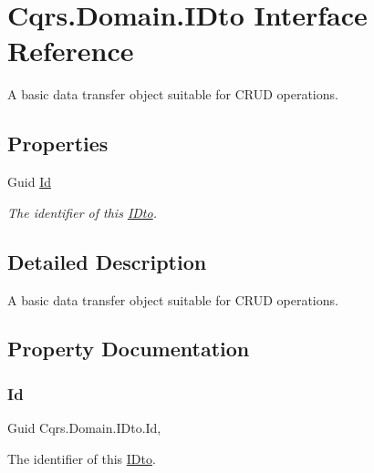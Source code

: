 \hypertarget{interfaceCqrs_1_1Domain_1_1IDto}{}\section{Cqrs.\+Domain.\+I\+Dto Interface Reference}
\label{interfaceCqrs_1_1Domain_1_1IDto}


A basic data transfer object suitable for C\+R\+UD operations.  


\subsection*{Properties}
\begin{DoxyCompactItemize}
\item 
Guid \hyperlink{interfaceCqrs_1_1Domain_1_1IDto_a0314be1599b3bf36d05082be10cbca48_a0314be1599b3bf36d05082be10cbca48}{Id}
\begin{DoxyCompactList}\small\item\em The identifier of this \hyperlink{interfaceCqrs_1_1Domain_1_1IDto}{I\+Dto}. \end{DoxyCompactList}\end{DoxyCompactItemize}


\subsection{Detailed Description}
A basic data transfer object suitable for C\+R\+UD operations. 



\subsection{Property Documentation}
\mbox{\label{interfaceCqrs_1_1Domain_1_1IDto_a0314be1599b3bf36d05082be10cbca48_a0314be1599b3bf36d05082be10cbca48}} 
\subsubsection{\texorpdfstring{Id}{Id}}
{\footnotesize\ttfamily Guid Cqrs.\+Domain.\+I\+Dto.\+Id\hspace{0.3cm}{\ttfamily [get]}, {\ttfamily [set]}}



The identifier of this \hyperlink{interfaceCqrs_1_1Domain_1_1IDto}{I\+Dto}. 

